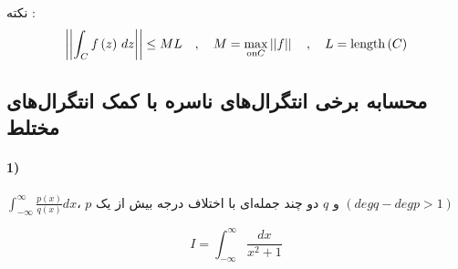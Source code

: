 نکته :
\[
\left|\left| \int_C f\left(z\right)\, dz \right|\right|\le ML \quad , \quad M=\max_{\text{on} C}\left|\left| f \right|\right| \quad , \quad L=\text{length}\left(C\right)
\]

\newpage

\subsection{محسابه برخی انتگرال‌های ناسره با کمک انتگرال‌های مختلط}

\paragraph{1)}
$
	\int_{-\infty}^{\infty} \frac{p(x)}{q(x)} dx
$،
$p$
و
$q$
دو چند جمله‌ای با اختلاف درجه بیش از یک
$(deg q - deg p > 1)$

\example

\begin{equation*}
I = \int_{-\infty}^{\infty} \frac{dx}{x^2+1}
\end{equation*}

